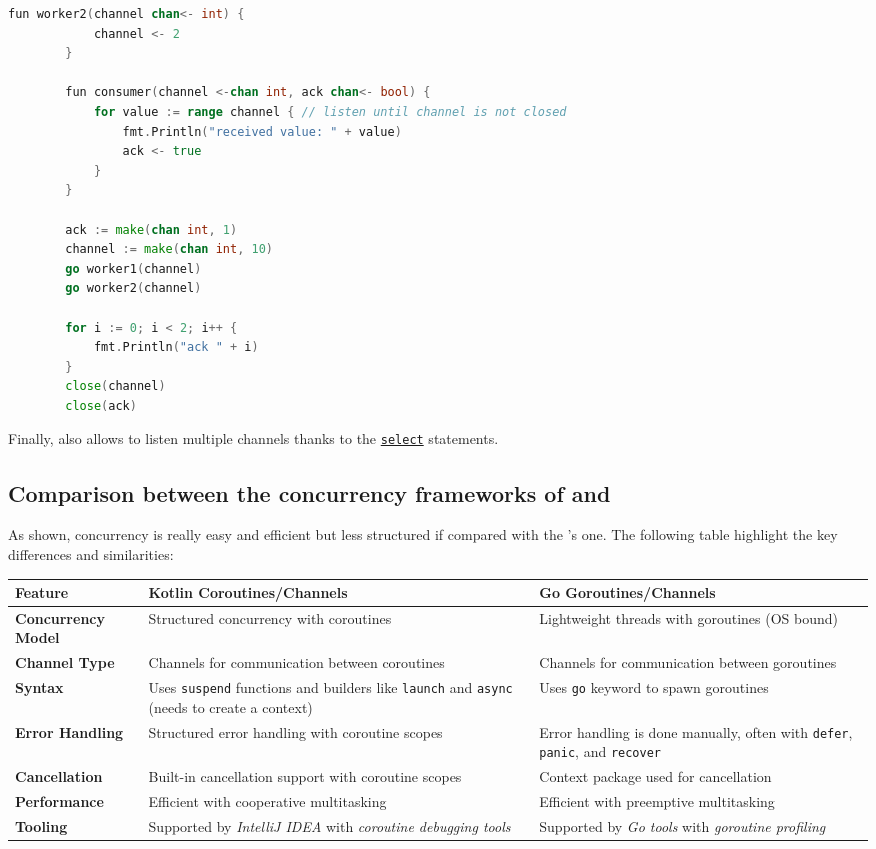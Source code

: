 \begin{itemize}
\begin{lstlisting}[language=go]
		fun worker2(channel chan<- int) {
			channel <- 2
		}
		
		fun consumer(channel <-chan int, ack chan<- bool) {
			for value := range channel { // listen until channel is not closed
				fmt.Println("received value: " + value)
				ack <- true
			}
		}
		
		ack := make(chan int, 1)
		channel := make(chan int, 10)
		go worker1(channel)
		go worker2(channel)
		
		for i := 0; i < 2; i++ {
			fmt.Println("ack " + i)
		}
		close(channel)
		close(ack)		
	\end{lstlisting}
	
	Finally, \Go also allows to listen multiple channels thanks to the \href{https://go.dev/tour/concurrency/5}{\texttt{select}} statements.
\end{itemize}

\subsection{Comparison between the concurrency frameworks of \Kotlin and \Go}

As shown, \Go concurrency is really easy and efficient but less structured if compared with the \Kotlin 's one.
The following table highlight the key differences and similarities:

\begin{center}
	\begin{tabular}{|>{\raggedright\arraybackslash}p{4cm}|>{\raggedright\arraybackslash}p{5cm}|>{\raggedright\arraybackslash}p{5cm}|}
		\hline
		\textbf{Feature} & \textbf{Kotlin Coroutines/Channels} & \textbf{Go Goroutines/Channels} \\
		\hline
		\textbf{Concurrency Model} & Structured concurrency with coroutines & Lightweight threads with goroutines (OS bound) \\
		\hline
		\textbf{Channel Type} & Channels for communication between coroutines & Channels for communication between goroutines \\
		\hline
		\textbf{Syntax} & Uses \texttt{suspend} functions and builders like \texttt{launch} and \texttt{async} (needs to create a context) & Uses \texttt{go} keyword to spawn goroutines \\
		\hline
		\textbf{Error Handling} & Structured error handling with coroutine scopes & Error handling is done manually, often with \texttt{defer}, \texttt{panic}, and \texttt{recover} \\
		\hline
		\textbf{Cancellation} & Built-in cancellation support with coroutine scopes & Context package used for cancellation \\
		\hline
		\textbf{Performance} & Efficient with cooperative multitasking & Efficient with preemptive multitasking \\
		\hline
		\textbf{Tooling} & Supported by \textit{IntelliJ IDEA} with \textit{coroutine debugging tools} & Supported by \textit{Go tools} with \textit{goroutine profiling} \\
		\hline
	\end{tabular}
\end{center}